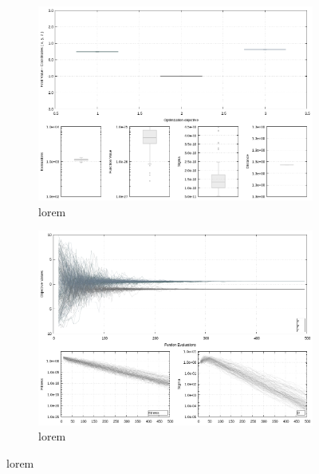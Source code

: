 \begin{figure}[h]
         \centering
         \begin{subfigure}[h]{0.4\textwidth}
                 \centering
                 \includegraphics[width=\textwidth]{img/calibration/calibration_ant0-boxes.png}
                 \caption{lorem}
                 \label{fig:Final_Calibration_Ant0_ES-boxes}
         \end{subfigure}
%
\qquad         
%
         \begin{subfigure}[h]{0.4\textwidth}
                 \centering
                 \includegraphics[width=\textwidth]{img/calibration/calibration_ant0-lines.png}
                 \caption{lorem}
                 \label{fig:Final_Calibration_Ant0_ES-Lines}
         \end{subfigure}

\end{figure}
